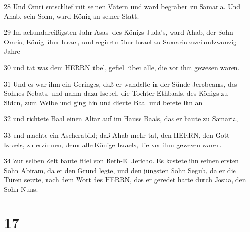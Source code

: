 \par 28 Und Omri entschlief mit seinen Vätern und ward begraben zu Samaria. Und Ahab, sein Sohn, ward König an seiner Statt.
\par 29 Im achunddreißigsten Jahr Asas, des Königs Juda's, ward Ahab, der Sohn Omris, König über Israel, und regierte über Israel zu Samaria zweiundzwanzig Jahre
\par 30 und tat was dem HERRN übel, gefiel, über alle, die vor ihm gewesen waren.
\par 31 Und es war ihm ein Geringes, daß er wandelte in der Sünde Jerobeams, des Sohnes Nebats, und nahm dazu Isebel, die Tochter Ethbaals, des Königs zu Sidon, zum Weibe und ging hin und diente Baal und betete ihn an
\par 32 und richtete Baal einen Altar auf im Hause Baals, das er baute zu Samaria,
\par 33 und machte ein Ascherabild; daß Ahab mehr tat, den HERRN, den Gott Israels, zu erzürnen, denn alle Könige Israels, die vor ihm gewesen waren.
\par 34 Zur selben Zeit baute Hiel von Beth-El Jericho. Es kostete ihn seinen ersten Sohn Abiram, da er den Grund legte, und den jüngsten Sohn Segub, da er die Türen setzte, nach dem Wort des HERRN, das er geredet hatte durch Josua, den Sohn Nuns.

\chapter{17}

